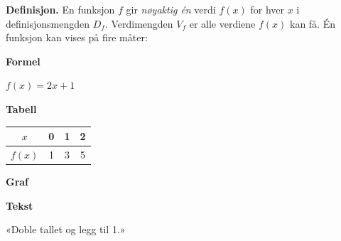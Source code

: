 \begin{mustkunne}
\textbf{Definisjon.} En funksjon $f$ gir \emph{nøyaktig én} verdi $f(x)$ for hver $x$ i definisjonsmengden $D_f$.
Verdimengden $V_f$ er alle verdiene $f(x)$ kan få. Én funksjon kan vises på fire måter:
\medskip

\begin{minipage}[t]{0.23\linewidth}
\textbf{Formel}\par
$f(x) = 2x + 1$
\end{minipage}\hfill
\begin{minipage}[t]{0.23\linewidth}
\textbf{Tabell}\par
\small
\begin{tabular}[t]{@{}c|ccc@{}}
$x$ & 0 & 1 & 2\\ \hline
$f(x)$ & 1 & 3 & 5\\
\end{tabular}
\end{minipage}\hfill
\begin{minipage}[t]{0.23\linewidth}
\textbf{Graf}\par
{}
\end{minipage}\hfill
\begin{minipage}[t]{0.23\linewidth}
\textbf{Tekst}\par
\small «Doble tallet og legg til 1.»
\end{minipage}


\end{mustkunne}
